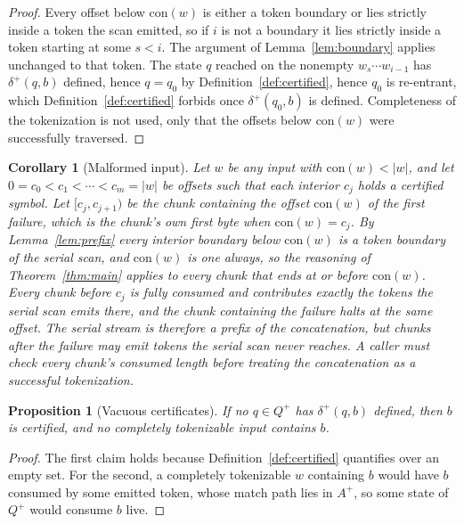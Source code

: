 \documentclass[11pt,a4paper]{article}
\theoremstyle{definition}
\theoremstyle{plain}
\newtheorem{corollary}{Corollary}
\newtheorem{proposition}{Proposition}
\begin{document}
\begin{proof}
Every offset below $\mathrm{con}(w)$ is either a token boundary or lies strictly inside a token the scan emitted, so if
$i$ is not a boundary it lies strictly inside a token starting at some $s < i$. The argument of Lemma~\ref{lem:boundary}
applies unchanged to that token. The state $q$ reached on the nonempty $w_s \cdots w_{i-1}$ has $\delta^+(q,b)$ defined,
hence $q = q_0$ by Definition~\ref{def:certified}, hence $q_0$ is re-entrant, which Definition~\ref{def:certified}
forbids once $\delta^+(q_0,b)$ is defined. Completeness of the tokenization is not used, only that the offsets below
$\mathrm{con}(w)$ were successfully traversed.
\end{proof}

\begin{corollary}[Malformed input] \label{cor:malformed} Let $w$ be any input with $\mathrm{con}(w) < |w|$, and let
$0 = c_0 < c_1 < \cdots < c_m = |w|$ be offsets such that each interior $c_j$ holds a certified symbol. Let
$[c_j, c_{j+1})$ be the chunk containing the offset $\mathrm{con}(w)$ of the first failure, which is the chunk's own
first byte when $\mathrm{con}(w) = c_j$. By Lemma~\ref{lem:prefix} every interior boundary below $\mathrm{con}(w)$ is a
token boundary of the serial scan, and $\mathrm{con}(w)$ is one always, so the reasoning of Theorem~\ref{thm:main}
applies to every chunk that ends at or before $\mathrm{con}(w)$. Every chunk before $c_j$ is fully consumed and
contributes exactly the tokens the serial scan emits there, and the chunk containing the failure halts at the same
offset. The serial stream is therefore a prefix of the concatenation, but chunks after the failure may emit tokens the
serial scan never reaches. A caller must check every chunk's consumed length before treating the concatenation as a
successful tokenization.
\end{corollary}

\begin{proposition}[Vacuous certificates]
\label{prop:vacuous}
If no $q \in Q^+$ has $\delta^+(q,b)$ defined, then $b$ is certified, and no completely tokenizable input contains $b$.
\end{proposition}

\begin{proof}
The first claim holds because Definition~\ref{def:certified} quantifies over an empty set. For the second, a completely
tokenizable $w$ containing $b$ would have $b$ consumed by some emitted token, whose match path lies in $A^+$, so some
state of $Q^+$ would consume $b$ live.
\end{proof}
\end{document}
